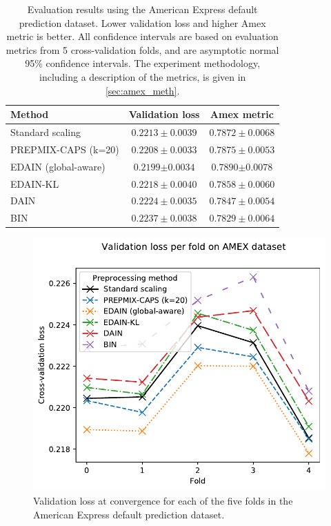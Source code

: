 \documentclass{statsmsc}
\begin{document}
{%
\begin{table}[htp]
    \centering
    \begin{tabular}{lcc}
        \toprule
        Method & Validation loss & Amex metric \\
        \midrule
        Standard scaling & $0.2213 \pm 0.0039$ & $0.7872 \pm 0.0068$ \\
        PREPMIX-CAPS (k=20) & $0.2208 \pm 0.0033$ & $0.7875 \pm 0.0053$ \\
        EDAIN (global-aware) & $\mathbf{0.2199} \bm\pm \mathbf{0.0034}$ & $\mathbf{0.7890} \bm\pm \mathbf{0.0078}$ \\
        EDAIN-KL & $0.2218 \pm 0.0040$ & $0.7858 \pm 0.0060$ \\
        DAIN & $0.2224 \pm 0.0035$ & $0.7847 \pm 0.0054$ \\
        BIN & $0.2237 \pm 0.0038$ & $0.7829 \pm 0.0064$ \\
        \bottomrule
    \end{tabular}%
    \caption{
        Evaluation results using the American Express default prediction dataset. Lower validation
        loss and higher Amex metric is better.
        All confidence intervals are based on evaluation metrics from 5 cross-validation folds,
        and are asymptotic normal 95\% confidence intervals.
        The experiment methodology, including a description of the metrics,
        is given in  \cref{sec:amex_meth}.
    }%
    \label{tab:amex_performance}%
\end{table}

\begin{figure}[htp]
    \begin{center}
        \includegraphics[scale=0.9]{figures/amex_performance_convergence_per_fold}
    \end{center}
    \caption{
        Validation loss at convergence for each of the five folds in the American Express
        default prediction dataset.
    }%
    \label{fig:amex_folds}
\end{figure}

}
\end{document}
